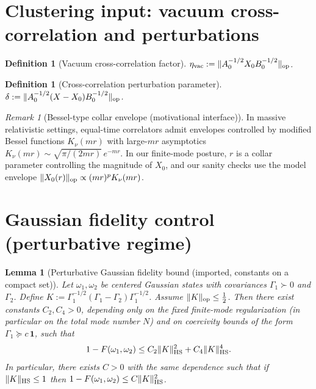 \documentclass[11pt]{article}
\newtheorem{lemma}[theorem]{Lemma}
\newtheorem{definition}[theorem]{Definition}
\theoremstyle{remark}
\newtheorem{remark}[theorem]{Remark}
\newcommand{\HS}{{\rm HS}}
\newcommand{\op}{{\rm op}}
\begin{document}
\section{Clustering input: vacuum cross-correlation and perturbations}
\begin{definition}[Vacuum cross-correlation factor]
\label{def:etavac}
$\eta_{\rm vac} := \| A_0^{-1/2} X_0 B_0^{-1/2} \|_\op$.
\end{definition}

\begin{definition}[Cross-correlation perturbation parameter]
\label{def:delta}
$\delta := \| A_0^{-1/2} (X - X_0) B_0^{-1/2} \|_\op$.
\end{definition}

\begin{remark}[Bessel-type collar envelope (motivational interface)]
In massive relativistic settings, equal-time correlators admit envelopes
controlled by modified Bessel functions $K_\nu(mr)$ with large-$mr$
asymptotics $K_\nu(mr) \sim \sqrt{\pi/(2mr)}\, e^{-mr}$. In our finite-mode
posture, $r$ is a collar parameter controlling the magnitude of $X_0$, and
our sanity checks use the model envelope
$\|X_0(r)\|_\op \propto (mr)^p K_\nu(mr)$.
\end{remark}

\section{Gaussian fidelity control (perturbative regime)}
\begin{lemma}[Perturbative Gaussian fidelity bound (imported, constants on a
compact set)]
\label{lem:fid}
Let $\omega_1, \omega_2$ be centered Gaussian states with covariances
$\Gamma_1 \succ 0$ and $\Gamma_2$. Define
$K := \Gamma_1^{-1/2}(\Gamma_1 - \Gamma_2)\Gamma_1^{-1/2}$. Assume
$\|K\|_\op \le \frac12$. Then there exist constants $C_2, C_4 > 0$,
depending only on the fixed finite-mode regularization (in particular on
the total mode number $N$) and on coercivity bounds of the form
$\Gamma_1 \succeq c\,\mathbf{1}$, such that
\[
1 - F(\omega_1, \omega_2) \le C_2 \|K\|_\HS^2 + C_4 \|K\|_\HS^4 .
\]
In particular, there exists $C > 0$ with the same dependence such that if
$\|K\|_\HS \le 1$ then $1 - F(\omega_1,\omega_2) \le C \|K\|_\HS^2$.
\end{lemma}
\end{document}
